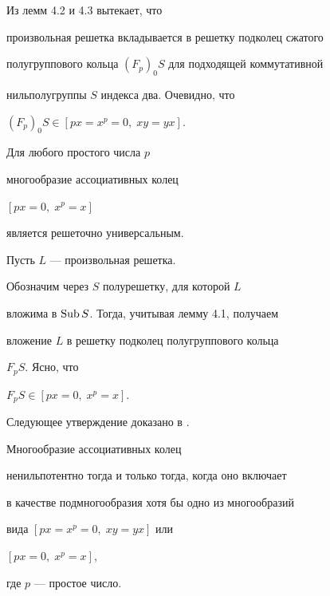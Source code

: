 \begin{pf} Из лемм 4.2 и 4.3 вытекает, что


произвольная решетка вкладывается в решетку подколец сжатого


полугруппового кольца $(F_p)_0S$ для подходящей коммутативной


нильполугруппы $S$ индекса два. Очевидно, что


$(F_p)_0S \in [px = x^p = 0,\; xy = yx]$.


\end{pf}





\begin{lemm} Для любого простого числа $p$


многообразие ассоциативных колец


$[px = 0,\; x^p = x]$


является решеточно универсальным.


\end{lemm}





\begin{pf} Пусть $L$ --- произвольная решетка.


Обозначим через $S$ полурешетку, для которой $L$


вложима в $\operatorname{Sub} S$. Тогда, учитывая лемму 4.1, получаем


вложение $L$ в решетку подколец полугруппового кольца


$F_pS$. Ясно, что


$F_pS \in [px = 0,\; x^p = x]$.


\end{pf}





Следующее утверждение доказано в \cite{Lvo}.





\begin{lemm} Многообразие ассоциативных колец


ненильпотентно тогда и только тогда, когда оно включает


в качестве подмногообразия хотя бы одно из многообразий


вида $[px = x^p = 0,\; xy = yx]$ или


$[px = 0,\; x^p = x]$,


где $p$ --- простое число.


\end{lemm}





